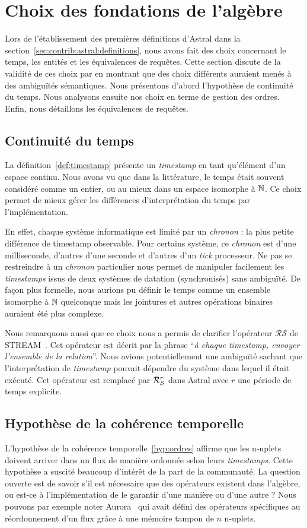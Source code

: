 \section{Choix des fondations de l'algèbre}\label{sec:valid:expressivite:modele}
Lors de l'établissement des premières définitions d'Astral dans la section~\ref{sec:contrib:astral:definitions}, nous avons fait des choix concernant le temps, les entités et les équivalences de requêtes. Cette section discute de la validité de ces choix par en montrant que des choix différents auraient menés à des ambiguïtés sémantiques. Nous présentons d'abord l'hypothèse de continuité du temps. Nous analysons ensuite nos choix en terme de gestion des ordres. Enfin, nous détaillons les équivalences de requêtes.

\subsection{Continuité du temps}
La définition~\ref{def:timestamp} présente un \textit{timestamp} en tant qu'élément d'un espace continu. Nous avons vu que dans la littérature, le temps était souvent considéré comme un entier, ou au mieux dans un espace isomorphe à $\mathbb{N}$. Ce choix permet de mieux gérer les différences d'interprétation du temps par l'implémentation.

En effet, chaque système informatique est limité par un \textit{chronon} : la plus petite différence de timestamp observable. Pour certains système, ce \textit{chronon} est d'une milliseconde, d'autres d'une seconde et d'autres d'un \textit{tick} processeur. Ne pas se restreindre à un \textit{chronon} particulier nous permet de manipuler facilement les \textit{timestamps} issus de deux systèmes de datation (synchronisés) sans ambiguïté. De façon plus formelle, nous aurions pu définir le temps comme un ensemble isomorphe à $\mathbb{N}$ quelconque mais les jointures et autres opérations binaires auraient été plus complexe.

Nous remarquons aussi que ce choix nous a permis de clarifier l'opérateur $\mathcal{RS}$ de STREAM~\cite{Arasu:stream}. Cet opérateur est décrit par la phrase \enquote{\it à chaque timestamp, envoyer l'ensemble de la relation}. Nous avions potentiellement une ambiguïté sachant que l'interprétation de \textit{timestamp} pouvait dépendre du système dans lequel il était exécuté. Cet opérateur est remplacé par $\mathcal{R}_{\mathcal S}^{r}$ dans Astral avec $r$ une période de temps explicite.

\subsection{Hypothèse de la cohérence temporelle}
L'hypothèse de la cohérence temporelle~\ref{hyp:ordres} affirme que les n-uplets doivent arriver dans un flux de manière ordonnée selon leurs \textit{timestamps}. Cette hypothèse a suscité beaucoup d'intérêt de la part de la communauté. La question ouverte est de savoir s'il est nécessaire que des opérateurs existent dans l'algèbre, ou est-ce à l'implémentation de le garantir d'une manière ou d'une autre ? Nous pouvons par exemple noter Aurora~\cite{Abadi:aurora} qui avait défini des opérateurs spécifiques au réordonnement d'un flux grâce à une mémoire tampon de $n$ n-uplets.

